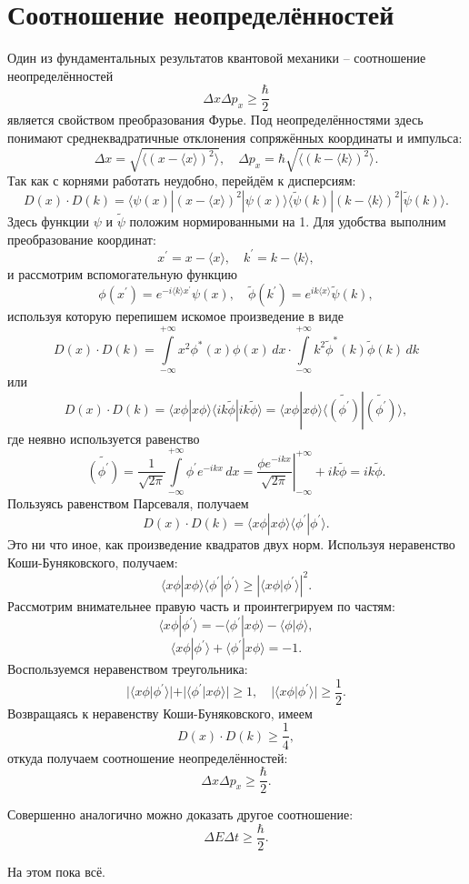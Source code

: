 \documentclass{ncc}
\begin{document}
\section{Соотношение неопределённостей}
Один из фундаментальных результатов квантовой механики -- соотношение
неопределённостей
\[
    \Delta x  \Delta p_x \ge \frac{\hbar}{2}
\]
является свойством преобразования Фурье. Под неопределённостями здесь понимают
среднеквадратичные отклонения сопряжённых координаты и импульса:
\[
    \Delta x = \sqrt{\langle(x-\langle x \rangle)^2\rangle},\quad
    \Delta p_x = \hbar\sqrt{\langle(k-\langle k \rangle)^2\rangle}.
\]
Так как с корнями работать неудобно, перейдём к дисперсиям:
\[
    D(x)\cdot D(k) = \langle\psi(x)|(x-\langle x\rangle)^2|\psi(x)\rangle
    \langle\tilde{\psi}(k)|(k-\langle k \rangle)^2|\tilde{\psi}(k)\rangle.
\]
Здесь функции \( \psi \)  и \( \tilde\psi \) положим нормированными на 1.
Для удобства выполним преобразование координат:
\[
    x^\prime = x - \langle x \rangle,\quad
    k^\prime = k - \langle k \rangle,
\]
и рассмотрим вспомогательную функцию
\[
    \phi(x^\prime) = e^{-i\langle k \rangle x^\prime} \psi(x),\quad
    \tilde{\phi}(k^\prime) = e^{ik\langle x \rangle} \tilde{\psi}(k),
\]
используя которую перепишем искомое произведение в виде
\[
    D(x)\cdot D(k) = \int\limits_{-\infty}^{+\infty} x^2 \phi^\ast(x)\phi(x)
    \,dx\cdot \int\limits_{-\infty}^{+\infty} k^2 \tilde{\phi}^\ast(k)\tilde{\phi}(k)\,dk
\]
или
\[
    D(x)\cdot D(k) = \langle x\phi|x \phi\rangle
    \langle ik\tilde{\phi}|ik \tilde{\phi}\rangle =
    \langle x\phi|x \phi\rangle
    \langle \tilde{\left(\phi^\prime\right)}|\tilde{\left(\phi^\prime\right)}\rangle,
\]
где неявно используется равенство
\[
    \tilde{(\phi^\prime)} = \frac{1}{\sqrt{2\pi}} \int\limits_{-\infty}^{+\infty}
    \phi^\prime e^{-ikx}\,dx =
    \left.\frac{\phi e^{-ikx}}{\sqrt{2\pi}}\right|_{-\infty}^{+\infty}
    +  ik\tilde{\phi} = ik\tilde{\phi}.
\]
Пользуясь равенством Парсеваля, получаем
\[
    D(x)\cdot D(k) = \langle x \phi|x \phi\rangle \langle \phi^\prime | \phi^\prime \rangle.
\]
Это ни что иное, как произведение квадратов двух норм. Используя неравенство
Коши-Буняковского, получаем:
\[
    \langle x\phi|x \phi\rangle
    \langle \phi^\prime|\phi^\prime\rangle \ge
    \left|\langle x\phi | \phi^\prime \rangle\right|^2.
\]
Рассмотрим внимательнее правую часть и проинтегрируем по частям:
\[
    \langle x\phi|\phi^\prime\rangle = -\langle \phi^\prime | x\phi \rangle
    - \langle\phi|\phi\rangle,
\]
\[
    \langle x\phi|\phi^\prime\rangle + \langle\phi^\prime|x\phi\rangle = -1.
\]
Воспользуемся неравенством треугольника:
\[
    |\langle x\phi|\phi^\prime\rangle| + |\langle\phi^\prime|x\phi\rangle| \ge 1,
    \quad
    |\langle x\phi|\phi^\prime\rangle| \ge \frac{1}{2}.
\]
Возвращаясь к неравенству Коши-Буняковского, имеем
\[
    D(x)\cdot D(k) \ge \frac{1}{4},
\]
откуда получаем соотношение неопределённостей:
\[
    \Delta x  \Delta p_x \ge \frac{\hbar}{2}.
\]

Совершенно аналогично можно доказать другое соотношение:
\[
    \Delta E  \Delta t \ge \frac{\hbar}{2}.
\]

На этом пока всё.
\end{document}
